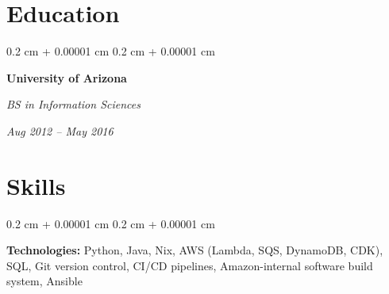 \documentclass[10pt, letterpaper]{article}
\newenvironment{onecolentry}{
    \begin{adjustwidth}{
        0.2 cm + 0.00001 cm
    }{
        0.2 cm + 0.00001 cm
    }
}{
    \end{adjustwidth}
} %
\newenvironment{twocolentry}[2][]{
    \onecolentry
    \def\secondColumn{#2}
    \setcolumnwidth{\fill, 4.5 cm}
    \begin{paracol}{2}
}{
    \switchcolumn \raggedleft \secondColumn
    \end{paracol}
    \endonecolentry
} %
\begin{document}
    
    \section{Education}



        
        \begin{twocolentry}{
            
            
        \textit{Aug 2012 – May 2016}}
            \textbf{University of Arizona}

            \textit{BS in Information Sciences}
        \end{twocolentry}




    
    \section{Skills}



        
        \begin{onecolentry}
            \textbf{Technologies:} Python, Java, Nix, AWS (Lambda, SQS, DynamoDB, CDK), SQL, Git version control, CI/CD pipelines, Amazon-internal software build system, Ansible
        \end{onecolentry}


    
\end{document}
